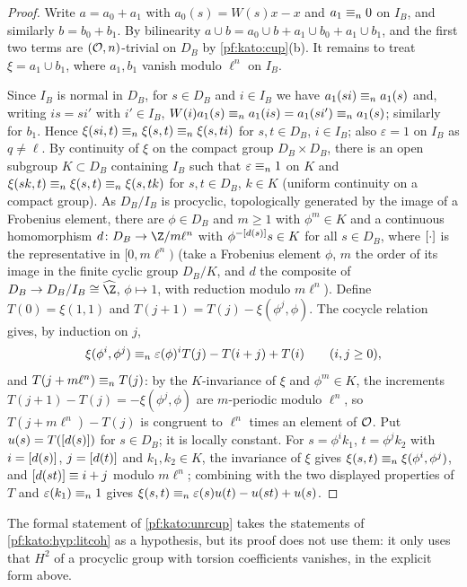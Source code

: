 \begin{proof}
Write $a=a_0+a_1$ with $a_0(s)=W(s)x-x$ and $a_1\equiv_{n}0$ on $I_B$, and similarly $b=b_0+b_1$. By bilinearity
$a\cup b=a_0\cup b+a_1\cup b_0+a_1\cup b_1$, and the first two terms are $(\mathcal{O},n)$-trivial on $D_B$ by
\cref{pf:kato:cup}(b). It remains to treat $\xi=a_1\cup b_1$, where $a_1,b_1$ vanish modulo $\ell^n$ on $I_B$.

Since $I_B$ is normal in $D_B$, for $s\in D_B$ and $i\in I_B$ we have $a_1(si)\equiv_{n}a_1(s)$ and, writing $is=si'$
with $i'\in I_B$, $W(i)a_1(s)\equiv_{n}a_1(is)=a_1(si')\equiv_{n}a_1(s)$; similarly for $b_1$. Hence
$\xi(si,t)\equiv_{n}\xi(s,t)\equiv_{n}\xi(s,ti)$ for $s,t\in D_B$, $i\in I_B$; also $\varepsilon=1$ on $I_B$ as $q\ne\ell$. By
continuity of $\xi$ on the compact group $D_B\times D_B$, there is an open subgroup $K\subset D_B$ containing $I_B$ such
that $\varepsilon\equiv_{n}1$ on $K$ and $\xi(sk,t)\equiv_{n}\xi(s,t)\equiv_{n}\xi(s,tk)$ for $s,t\in D_B$, $k\in K$
(uniform continuity on a compact group). As $D_B/I_B$ is procyclic, topologically generated by
the image of a Frobenius element, there are $\phi\in D_B$ and $m\ge1$ with $\phi^m\in K$ and a continuous homomorphism
$d\colon D_B\to\Z/m\ell^n$ with $\phi^{-[d(s)]}s\in K$ for all $s\in D_B$, where $[\cdot]$ is the representative
in $[0,m\ell^n)$ (take a Frobenius element $\phi$, $m$ the order of its image in
the finite cyclic group $D_B/K$, and $d$ the composite of $D_B\to D_B/I_B\cong\widehat\Z$, $\phi\mapsto1$, with reduction modulo $m\ell^n$). Define
$T(0)=\xi(1,1)$ and $T(j+1)=T(j)-\xi(\phi^j,\phi)$. The cocycle relation gives, by induction on $j$,
\[
  \xi(\phi^i,\phi^j)\equiv_{n}\varepsilon(\phi)^iT(j)-T(i+j)+T(i)\qquad(i,j\ge0),
\]
and $T(j+m\ell^n)\equiv_{n}T(j)$: by the $K$-invariance of $\xi$ and $\phi^m\in K$, the increments $T(j+1)-T(j)=-\xi(\phi^j,\phi)$ are
$m$-periodic modulo $\ell^n$, so $T(j+m\ell^n)-T(j)$ is congruent to $\ell^n$ times an element of $\mathcal{O}$.
Put $u(s)=T([d(s)])$ for $s\in D_B$; it is locally constant. For $s=\phi^ik_1$, $t=\phi^jk_2$ with
$i=[d(s)]$, $j=[d(t)]$ and $k_1,k_2\in K$, the invariance of $\xi$ gives $\xi(s,t)\equiv_{n}\xi(\phi^i,\phi^j)$, and
$[d(st)]\equiv i+j$ modulo $m\ell^n$; combining with the two displayed properties of $T$ and $\varepsilon(k_1)\equiv_{n}1$ gives
$\xi(s,t)\equiv_{n}\varepsilon(s)u(t)-u(st)+u(s)$.
\end{proof}

\begin{remark}
The formal statement of \cref{pf:kato:unrcup} takes the statements of \cref{pf:kato:hyp:litcoh} as a hypothesis, but
its proof does not use them: it only uses that $H^2$ of a procyclic group with torsion coefficients vanishes, in the
explicit form above.
\end{remark}

